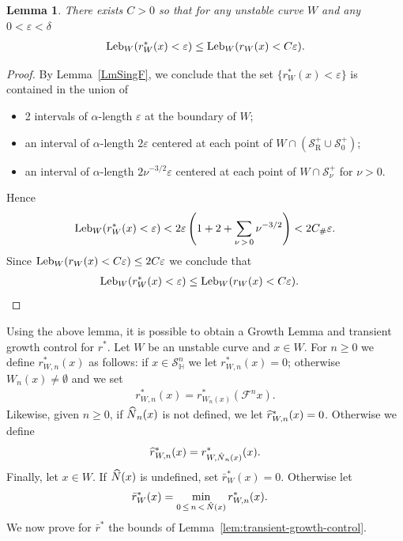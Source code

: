 \documentclass[10pt]{amsart}
\newtheorem{lemm}[theo]{Lemma}\newtheorem{prop}[theo]{Proposition}\newtheorem{coro}[theo]{Corollary}\newtheorem{conj}[theo]{Conjecture}
\theoremstyle{definition}\newtheorem{defi}[theo]{Definition}\newtheorem{rema}[theo]{Remark}\newtheorem{exam}[theo]{Example}\newtheorem{exem}[theo]{Example}\newtheorem{nota}[theo]{Notation}
\newcommand{\eps}{\varepsilon}
\newcommand{\homo}{\mathbb{H}}
\newcommand{\cm}{\mathcal{F}}
\newcommand{\recoPrivate}{\mathrm{R}}
\newcommand{\singPrivate}{\mathcal{S}}
\newcommand{\hsing}[1]{{\singPrivate}_\homo^{#1}}
\newcommand{\singForward}[1]{\singPrivate^+_{#1}}
\newcommand{\admName}{\alpha^{+}}
\newcommand{\Np}{\hat N}
\newcommand{\Leb}{\textup{Leb}}
\newcommand{\indCell}{\nu}
\newcommand{\Const}{C_\#}
\renewcommand{\admName}{\alpha}
\let\oldhat\hat
\renewcommand*{\hat}[1]{\mathchoice{\widehat{#1}}{\widehat{#1}}{\oldhat{#1}}{\oldhat{#1}}}
\begin{document}
\begin{lemm}\label{lem:r-star-vs-r}
There exists $C > 0$ so that for any unstable curve $W$ and any $0 < \eps<\delta$
\begin{align*}
\Leb_{W}(r^{*}_{W}(x) < \eps)\le \Leb_W(r_{W}(x) < C\eps).
\end{align*}
\end{lemm}
\begin{proof}
By Lemma~\ref{LmSingF}, we conclude that the set $\{r_{W}^{*}(x) < \eps\}$ is contained in the union of
\begin{itemize}
\item 2 intervals of $\admName$-length $\eps$ at the boundary of $W$;

\item an interval of $\admName$-length $2\eps$ centered at each point of $W\cap(\singForward{\recoPrivate}\cup\singForward{0})$;

\item an interval of $\admName$-length $2\indCell^{-3/2}\eps$ centered at each point of $W\cap\singForward{\indCell}$ for $\nu>0$.
\end{itemize}

Hence
\begin{align*}
\Leb_{W}(r_{W}^{*}(x) < \eps) < 2\eps \left(1+2+\sum_{\indCell\,>\,0}\indCell^{-3/2}\right) < 2\Const\eps.
\end{align*}
Since $\Leb_{W}(r_{W}(x) < C\eps)\leq 2 C \eps$ we conclude that
\begin{align*}
\Leb_{W}(r_{W}^{*}(x) < \eps) & \le \Leb_{W}(r_{W}(x) < C\eps).\qedhere
\end{align*}
\end{proof}

Using the above lemma, it is possible to obtain a Growth Lemma and transient growth control for $r^{*}$. Let $W$ be an unstable curve and $x\in W$. For $n\ge0$ we define $r^{*}_{W,n}(x)$ as follows: if $x\in\hsing n$ we let $r^{*}_{W,n}(x) = 0$; otherwise $W_{n}(x)\ne\emptyset$ and we set
\begin{align*}
r^{*}_{W,n}(x) = r^{*}_{W_{n}(x)}(\cm^{n}x).
\end{align*}
Likewise, given $n\ge 0$, if $\Np_{n}(x)$ is not defined, we let $\hat r^{*}_{W,n}(x) = 0$. Otherwise we define
\begin{equation}\label{DefHatR}
\hat r^{*}_{W,n}(x) = r^{*}_{W,\Np_{n}(x)}(x).
\end{equation}
Finally, let $x\in W$. If $\Np(x)$ is undefined, set $\bar r^{*}_{W}(x) = 0$. Otherwise let
\begin{align*}
\bar r^{*}_{W}(x) &= \min_{0\,\le\,n\,<\,\Np(x)}r^{*}_{W,n}(x).
\end{align*}
We now prove for $\bar r^{*}$ the bounds of Lemma~\ref{lem:transient-growth-control}.
\end{document}
